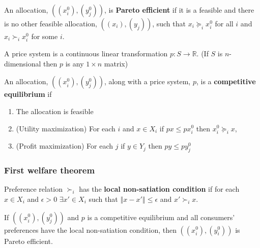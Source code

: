 \documentclass[compress]{beamer}
\def\R{\mathbb{R}}
\newcommand{\norm}[1]{\left\Vert {#1} \right\Vert}
\newcommand{\prefeq}{\succeq}
\newcommand{\pref}{\succ}
\begin{document}
\begin{frame}
  \begin{definition}
    An allocation, $((x_i^0),(y_j^0))$, is \textbf{Pareto efficient}
    if it is a feasible and there is no other feasible allocation,
    $((x_i),(y_j))$, such that $x_i \prefeq_i x_i^0$ for all $i$ and
    $x_i \pref_i x_i^0$ for some $i$.
  \end{definition}

  \begin{definition}
    A price system is a continuous linear transformation $p:S
    \rightarrow \R$. (If $S$ is $n$-dimensional then $p$ is any $1
    \times n$ matrix)
  \end{definition}
\end{frame}

\begin{frame}
  \begin{definition}
    An allocation, $((x_i^0),(y_j^0))$, along with a price system, $p$,
    is a \textbf{competitive equilibrium} if 
    \renewcommand{\theenumi}{C\arabic{enumi}}
    \begin{enumerate}
    \item\label{c1} The allocation is feasible
    \item\label{c2} (Utility maximization) For each $i$ and $x \in X_i$
      if $px \leq px_i^0$ 
      then $x_i^0 \prefeq_i x$, 
    \item\label{c3} (Profit maximization) For each $j$ if $y \in Y_j$
      then $p y \leq p y_j^0$ 
    \end{enumerate}
    \renewcommand{\theenumi}{\roman{enumi}}
  \end{definition}
\end{frame}


\begin{frame}
  \frametitle{First welfare theorem}
  \begin{definition}
    Preference relation $\pref_i$ has the \textbf{local non-satiation
      condition} if for each $x \in X_i$ and $\epsilon > 0$ $\exists x'
    \in X_i$ such that $\norm{x - x'} \leq \epsilon $ and $x' \pref_i x$.
  \end{definition}
  
  \begin{theorem}
    If $((x_i^0),(y^0_j))$ and $p$ is a competitive equilibrium and all
    consumers' preferences have the local non-satiation condition, then
    $((x_i^0),(y_i^0))$ is Pareto efficient.
  \end{theorem}
\end{frame}  
\end{document}
